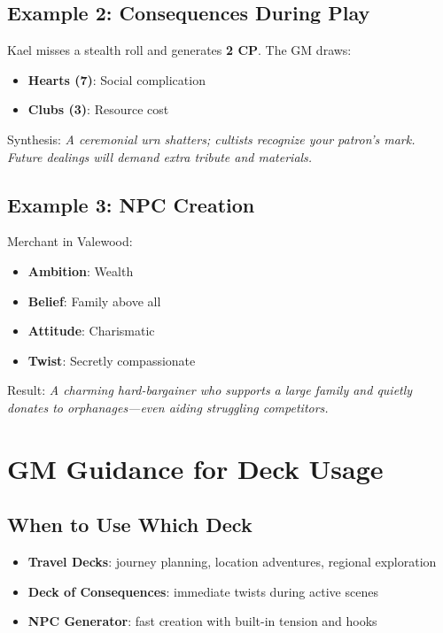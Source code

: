\subsection{Example 2: Consequences During Play}
\label{subsec:example-consequences}

Kael misses a stealth roll and generates \textbf{2 CP}. The GM draws:
\begin{itemize}
\item \textbf{Hearts (7)}: Social complication
\item \textbf{Clubs (3)}: Resource cost
\end{itemize}
Synthesis: \emph{A ceremonial urn shatters; cultists recognize your patron’s mark. Future dealings will demand extra tribute and materials.}

\subsection{Example 3: NPC Creation}
\label{subsec:example-npc}

Merchant in Valewood:
\begin{itemize}
\item \textbf{Ambition}: Wealth
\item \textbf{Belief}: Family above all
\item \textbf{Attitude}: Charismatic
\item \textbf{Twist}: Secretly compassionate
\end{itemize}
Result: \emph{A charming hard-bargainer who supports a large family and quietly donates to orphanages—even aiding struggling competitors.}

\section{GM Guidance for Deck Usage}
\label{sec:deck-guidance}

\subsection{When to Use Which Deck}
\label{subsec:deck-selection}

\begin{itemize}
\item \textbf{Travel Decks}: journey planning, location adventures, regional exploration
\item \textbf{Deck of Consequences}: immediate twists during active scenes
\item \textbf{NPC Generator}: fast creation with built-in tension and hooks
\end{itemize}

